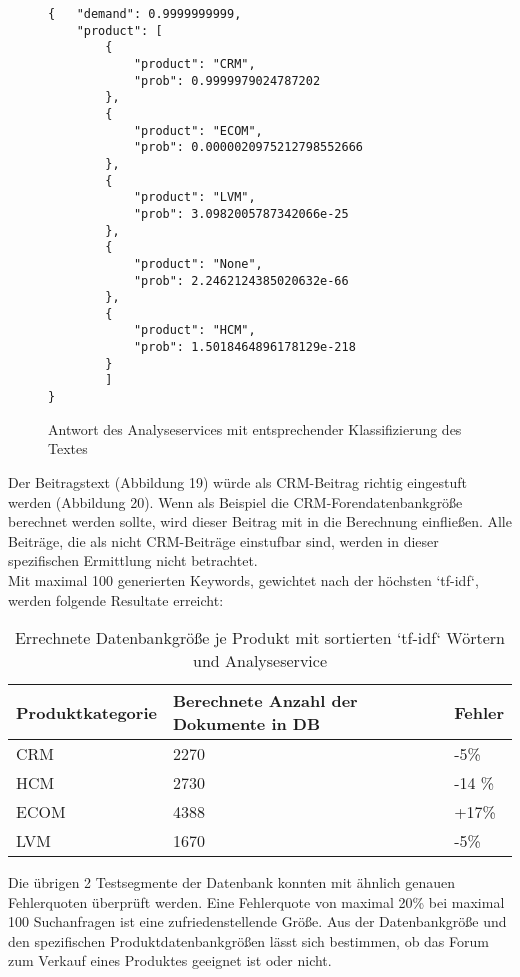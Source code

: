 \newpage

\begin{figure}[h!]
\begin{lstlisting}[language=HTML5]
{   "demand": 0.9999999999,
    "product": [
        {
            "product": "CRM",
            "prob": 0.9999979024787202
        },
        {
            "product": "ECOM",
            "prob": 0.0000020975212798552666
        },
        {
            "product": "LVM",
            "prob": 3.0982005787342066e-25
        },
        {
            "product": "None",
            "prob": 2.2462124385020632e-66
        },
        {
            "product": "HCM",
            "prob": 1.5018464896178129e-218
        }
		]
}
\end{lstlisting}
\caption{Antwort des Analyseservices mit entsprechender Klassifizierung des Textes}
\end{figure}

Der Beitragstext (Abbildung 19) würde als CRM-Beitrag richtig eingestuft werden (Abbildung 20). Wenn als Beispiel die CRM-Forendatenbankgröße berechnet werden sollte, wird dieser Beitrag mit in die Berechnung einfließen. Alle Beiträge, die als nicht CRM-Beiträge einstufbar sind, werden in dieser spezifischen Ermittlung nicht betrachtet.\\
Mit maximal 100 generierten Keywords, gewichtet nach der höchsten `tf-idf`, werden folgende Resultate erreicht:

\begin{table}[h!]
\begin{tabular}{ | p{3cm} | l | l |}
\hline
\textbf{Produktkategorie} & \textbf{Berechnete Anzahl der Dokumente in DB} & \textbf{Fehler} \\ \hline
CRM & 2270 & -5\% \\ \hline
HCM & 2730 & -14 \% \\ \hline
ECOM & 4388 & +17\% \\ \hline
LVM & 1670 & -5\% \\ \hline
\end{tabular}
\caption{Errechnete Datenbankgröße je Produkt mit sortierten `tf-idf` Wörtern und Analyseservice}
\end{table}

Die übrigen 2 Testsegmente der Datenbank konnten mit ähnlich genauen Fehlerquoten überprüft werden.
Eine Fehlerquote von maximal 20\% bei maximal 100 Suchanfragen ist eine zufriedenstellende Größe. Aus der Datenbankgröße und den spezifischen Produktdatenbankgrößen lässt sich bestimmen, ob das Forum zum Verkauf eines Produktes geeignet ist oder nicht.
\newpage